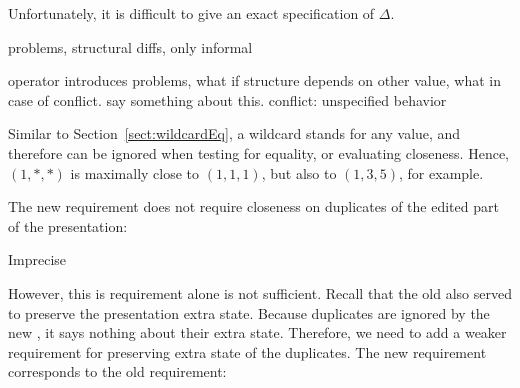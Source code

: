 \toHere
Unfortunately, it is difficult to give an exact specification of $\Delta$. 

problems, structural diffs, only informal

operator introduces problems, what if structure depends on other value, what in case of conflict. say something about this.
conflict: unspecified behavior 
\fromHere

Similar to Section~\ref{sect:wildcardEq}, a wildcard stands for any value, and therefore can be ignored when testing for equality, or evaluating closeness. Hence, $(1,*,*)$ is maximally close to $(1,1,1)$, but also to $(1,3,5)$, for example.


%

%
%
%

The new  requirement does not require closeness on duplicates of the edited part of the presentation:

	{Imprecise}

However, this is requirement alone is not sufficient. Recall that the old  also served to preserve the presentation extra state. Because duplicates are ignored by the new , it says nothing about their extra state. Therefore, we need to add a weaker requirement for preserving extra state of the duplicates. The new requirement corresponds to the old  requirement:


